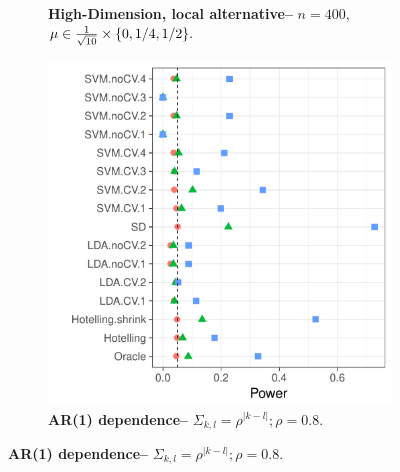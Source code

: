 \documentclass[12pt,a4paper]{article}
\begin{document}
\begin{figure}[h]
\centering
\caption{\mycaption}	
	\begin{subfigure}{.4\textwidth}
	  \centering
	  \caption{\textbf{High-Dimension, local alternative--} $n=400$, $\mu \in \frac{1}{\sqrt{10}} \times \{ 0,1/4,1/2 \}.$} 
	\label{fig:large_sample_3}
	\end{subfigure}
		\begin{subfigure}{.4\textwidth}
		  \centering
		  \includegraphics[width=1\linewidth]{"art/file11"}
		  \caption{\textbf{AR(1) dependence--} $\Sigma_{k,l}=\rho^{|k-l|}; \rho=0.8$. } 
		\label{fig:ar_1}
	\end{subfigure}
\end{figure}
\end{document}
